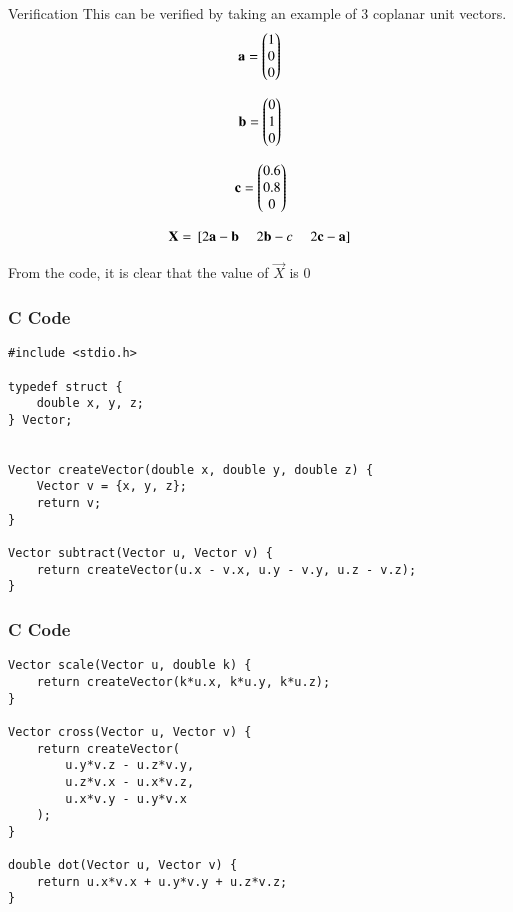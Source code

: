 \documentclass{beamer}
\begin{document}
\begin{frame}{Verification}
This can be verified by taking an example of 3 coplanar unit vectors.\\
\begin{align}
\mathbf{a} = \begin{pmatrix}1 \\ 0 \\ 0\end{pmatrix}
\end{align}

\begin{align}
\mathbf{b} = \begin{pmatrix}0 \\ 1 \\ 0\end{pmatrix}
\end{align}

\begin{align}
\mathbf{c} = \begin{pmatrix}0.6 \\ 0.8 \\ 0\end{pmatrix}
\end{align}

\begin{align}
\mathbf{X} = {}\left[2\mathbf{a}-\mathbf{b} \;\quad 2\mathbf{b}-c \;\quad 2\mathbf{c}-\mathbf{a}\right] 
\end{align}

From the code, it is clear that the value of $\vec{X}$ is 0   
\end{frame}
\begin{frame}[fragile]
    \frametitle{C Code}
    \begin{lstlisting}
#include <stdio.h>

typedef struct {
    double x, y, z;
} Vector;


Vector createVector(double x, double y, double z) {
    Vector v = {x, y, z};
    return v;
}

Vector subtract(Vector u, Vector v) {
    return createVector(u.x - v.x, u.y - v.y, u.z - v.z);
}

    \end{lstlisting}
\end{frame}

\begin{frame}[fragile]
    \frametitle{C Code}
    \begin{lstlisting}
Vector scale(Vector u, double k) {
    return createVector(k*u.x, k*u.y, k*u.z);
}

Vector cross(Vector u, Vector v) {
    return createVector(
        u.y*v.z - u.z*v.y,
        u.z*v.x - u.x*v.z,
        u.x*v.y - u.y*v.x
    );
}

double dot(Vector u, Vector v) {
    return u.x*v.x + u.y*v.y + u.z*v.z;
}

    \end{lstlisting}
\end{frame}
\end{document}
